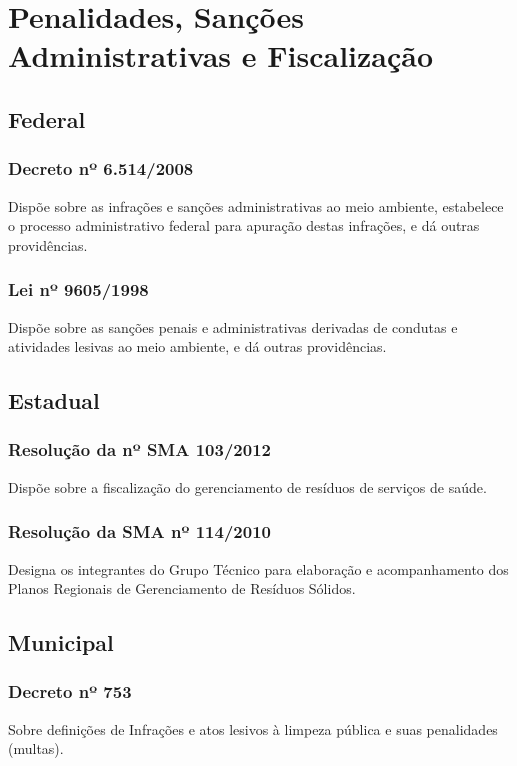 \section{Penalidades, Sanções Administrativas e Fiscalização}

\begin{subapend}
	\subsection{Federal}
	\begin{subsubapend}
		\item \subsubsection{Decreto nº 6.514/2008}
		Dispõe sobre as infrações e sanções administrativas ao meio ambiente, estabelece o processo administrativo federal para apuração destas infrações, e dá outras providências.
		\subsubsection{Lei nº 9605/1998}
		Dispõe sobre as sanções penais e administrativas derivadas de condutas e atividades lesivas ao meio ambiente, e dá outras providências.
	\end{subsubapend}
\end{subapend}



\begin{subapend}
	\subsection{Estadual}
	\begin{subsubapend}
		\item \subsubsection{Resolução da nº SMA 103/2012}
		Dispõe sobre a fiscalização do gerenciamento de resíduos de serviços de saúde.
		\subsubsection{Resolução da SMA nº 114/2010}
		Designa os integrantes do Grupo Técnico para elaboração e acompanhamento dos Planos Regionais de Gerenciamento de Resíduos Sólidos.
		\subsection{Municipal}
		\subsubsection{Decreto nº 753}
		Sobre definições de Infrações e atos lesivos à limpeza pública e suas penalidades (multas).
	\end{subsubapend}
\end{subapend}



